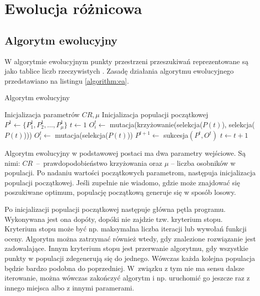 \documentclass[a4paper,onecolumn,oneside,12pt,wide,floatssmall]{mwrep}
\theoremstyle{definition}
\theoremstyle{plain}%
\theoremstyle{remark}
\begin{document}
\chapter{Ewolucja różnicowa}

\section{Algorytm ewolucyjny}

W algorytmie ewolucyjnym punkty przestrzeni przeszukiwań
reprezentowane są jako tablice liczb rzeczywistych \cite{jarabas}. 
Zasadę działania algorytmu ewolucyjnego przedstawiano na listingu \ref{algorithm:ea}.

\begin{algorithm}[H]
\caption{Algorytm ewolucyjny}
\label{algorithm:ea}
\begin{algorithmic}[1]
\State Inicjalizacja parametrów $CR, \mu$
\State Inicjalizacja populacji początkowej $P^1 \gets \{P^1_1, P^1_2, \ldots, P^1_{\mu}\}$
\State $t \gets 1$
      \State $O^t_i \gets$ mutacja(krzy{\.z}owanie(selekcja($P(t)$), selekcja($P(t)$)))
    \Else
      \State $O^t_i \gets$ mutacja(selekcja($P(t)$))
    \EndIf
  \EndFor
  \State $P^{t+1} \gets$ sukcesja$(P^t, O^t)$
  \State $t \gets t+1$
\EndWhile
\end{algorithmic}
\end{algorithm}

Algorytm ewolucyjny w podstawowej postaci ma dwa parametry wejściowe.
Są nimi: $CR$~--~prawdopodobieństwo krzyżowania oraz $\mu$ -- liczba osobników w populacji.
Po nadaniu wartości początkowych parametrom, następuja inicjalizacja populacji początkowej. 
Jeśli zupełnie nie wiadomo, gdzie może znajdować się poszukiwane optimum, 
populację początkową generuje się w sposób losowy. 

Po inicjalizacji populacji początkowej następuje główna pętla programu. 
Wykonywana jest ona dopóty, dopóki nie zajdzie tzw. kryterium stopu. 
Kryterium stopu może być np. maksymalna liczba iteracji lub wywołań funkcji oceny.
Algorytm można zatrzymać również wtedy, gdy znalezione rozwiązanie jest zadowalające. 
Innym kryterium stopu jest przerwanie algorytmu, gdy wszystkie 
punkty w populacji zdegenerują się do jednego. Wówczas
każda kolejna populacja będzie bardzo podobna do poprzedniej. 
W związku z tym nie ma sensu dalsze iterowanie, 
można wówczas zakończyć algorytm i np. uruchomić go jeszcze raz z innego miejsca
albo z innymi paramerami.
\end{document}
